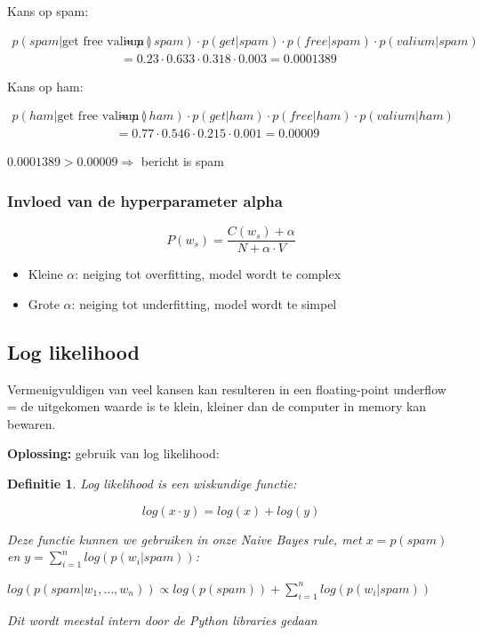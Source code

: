 \documentclass{article}
\newtheorem{theorem}{Definitie}[section]
\begin{document}
Kans op spam:

\begin{align*}
    p(spam | \text{get free valium}) & = p(spam) \cdot p(get|spam) \cdot p(free|spam) \cdot p(valium | spam)\\
    & = 0.23 \cdot 0.633 \cdot 0.318 \cdot 0.003 = 0.0001389
\end{align*}

Kans op ham:

\begin{align*}
    p(ham | \text{get free valium}) & = p(ham) \cdot p(get|ham) \cdot p(free|ham) \cdot p(valium | ham)\\
    & = 0.77 \cdot 0.546 \cdot 0.215 \cdot 0.001 = 0.00009
\end{align*}

$0.0001389 > 0.00009 \Rightarrow$ bericht is spam

\subsubsection{Invloed van de hyperparameter alpha}

\begin{equation*}
    P(w_s) = \frac{C(w_s) + \alpha}{N + \alpha \cdot V}
\end{equation*}

\begin{itemize}
    \item Kleine $\alpha$: neiging tot overfitting, model wordt te complex
    \item Grote $\alpha$: neiging tot underfitting, model wordt te simpel
\end{itemize}

\subsection{Log likelihood}

Vermenigvuldigen van veel kansen kan resulteren in een floating-point underflow
= de uitgekomen waarde is te klein, kleiner dan de computer in memory kan bewaren.

\textbf{Oplossing:} gebruik van log likelihood:

\begin{theorem}
    Log likelihood is een wiskundige functie: 
    
    \begin{equation}
        log(x \cdot y) = log(x) + log(y)
    \end{equation}

    Deze functie kunnen we gebruiken in onze Naive Bayes rule, met $x = p(spam)$ en $y = \sum_{i=1}^n log(p(w_i | spam))$:

    $log(p(spam | w_1, \dots, w_n)) \propto log(p(spam)) + \sum_{i=1}^n log(p(w_i | spam))$

    Dit wordt meestal intern door de Python libraries gedaan
\end{theorem}
\end{document}
